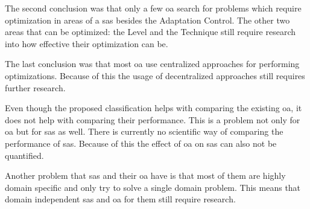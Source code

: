 \noindent The second conclusion was that only a few \acrshort{oa} search for problems which require optimization in areas of a \acrshort{sas}
besides the Adaptation Control. The other two areas that can be optimized: the Level and the Technique still require
research into how effective their optimization can be.

\noindent The last conclusion was that most \acrshort{oa} use centralized approaches for performing optimizations.
Because of this the usage of decentralized approaches still requires further research.

\noindent Even though the proposed classification helps with comparing the existing \acrshort{oa},
it does not help with comparing their performance.
This is a problem not only for \acrshort{oa} but for \acrshort{sas} as well.
There is currently no scientific way of comparing the performance of \acrshort{sas}.
Because of this the effect of \acrshort{oa} on \acrshort{sas} can also not be quantified.

\noindent Another problem that \acrshort{sas} and their \acrshort{oa} have is that
most of them are highly domain specific and only try to solve a single domain problem.
This means that domain independent \acrshort{sas} and \acrshort{oa} for them still require research.








